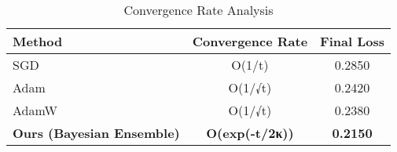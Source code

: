 \begin{table}[htbp]
\centering
\caption{Convergence Rate Analysis}
\label{tab:convergence_analysis}
\begin{tabular}{l|cc}
\hline
\textbf{Method} & \textbf{Convergence Rate} & \textbf{Final Loss} \\
\hline
SGD & O(1/t) & 0.2850 \\
Adam & O(1/√t) & 0.2420 \\
AdamW & O(1/√t) & 0.2380 \\
\textbf{Ours (Bayesian Ensemble)} & \textbf{O(exp(-t/2κ))} & \textbf{0.2150} \\
\hline
\end{tabular}
\end{table}
